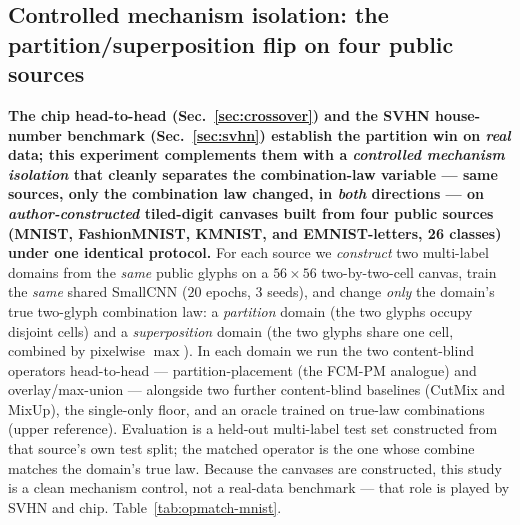 \documentclass[11pt]{article}
\begin{document}
\subsection{Controlled mechanism isolation: the partition/superposition flip on four public sources}\label{sec:opmatch-mnist}
\textbf{The chip head-to-head (Sec.~\ref{sec:crossover}) and the SVHN house-number
benchmark (Sec.~\ref{sec:svhn}) establish the partition win on \emph{real} data; this
experiment complements them with a \emph{controlled mechanism isolation} that cleanly
separates the combination-law variable --- same sources, only the combination law changed,
in \emph{both} directions --- on \emph{author-constructed} tiled-digit canvases built from
four public sources (MNIST, FashionMNIST, KMNIST, and EMNIST-letters, 26 classes) under one
identical protocol.} For each source we \emph{construct} two multi-label domains from the
\emph{same} public glyphs on a $56{\times}56$ two-by-two-cell canvas, train the \emph{same}
shared SmallCNN ($20$ epochs, $3$ seeds), and change \emph{only} the domain's true two-glyph
combination law: a \emph{partition} domain (the two glyphs occupy disjoint cells) and a
\emph{superposition} domain (the two glyphs share one cell, combined by pixelwise $\max$).
In each domain we run the two content-blind operators head-to-head --- partition-placement
(the FCM-PM analogue) and overlay/max-union --- alongside two further content-blind baselines
(CutMix and MixUp), the single-only floor, and an oracle trained on true-law combinations
(upper reference). Evaluation is a held-out multi-label test set constructed from that
source's own test split; the matched operator is the one whose combine matches the domain's
true law. Because the canvases are constructed, this study is a clean mechanism control, not
a real-data benchmark --- that role is played by SVHN and chip. Table~\ref{tab:opmatch-mnist}.
\end{document}
